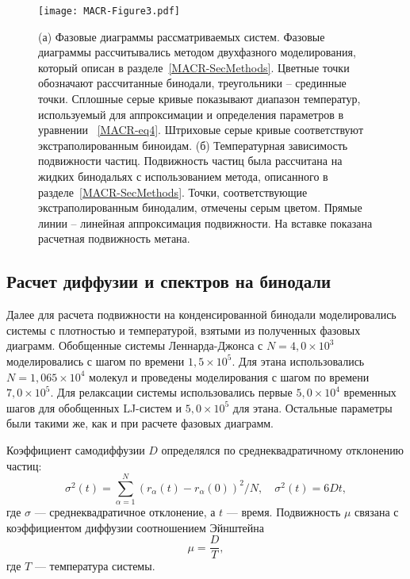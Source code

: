 \begin{figure}[!t]
  \centering
  \texttt{[image: MACR-Figure3.pdf]}
  \caption{(а) Фазовые диаграммы рассматриваемых систем. 
    Фазовые диаграммы рассчитывались методом двухфазного моделирования, который описан в разделе~\ref{MACR-SecMethods}.
    Цветные точки обозначают рассчитанные бинодали, треугольники -- срединные точки.
    Сплошные серые кривые показывают диапазон температур, используемый для аппроксимации и определения параметров в уравнении ~\eqref{MACR-eq4}.
    Штриховые серые кривые соответствуют экстраполированным биноидам.
    (б) Температурная зависимость подвижности частиц.
    Подвижность частиц была рассчитана на жидких бинодальях с использованием метода, описанного в разделе~\ref{MACR-SecMethods}.
    Точки, соответствующие экстраполированным бинодалим, отмечены серым цветом. 
    Прямые линии -- линейная аппроксимация подвижности.
    На вставке показана расчетная подвижность метана.}
  \label{MACR-Figure3}
\end{figure}

\subsection{Расчет диффузии и спектров на бинодали}

Далее для расчета подвижности на конденсированной бинодали моделировались системы с плотностью и температурой, взятыми из полученных фазовых диаграмм.
Обобщенные системы Леннарда-Джонса с $N = 4{,}0 \times 10 ^ 3$ моделировались с шагом по времени $1{,}5 \times 10 ^ 5$.
Для этана использовались $N = 1{,}065 \times 10 ^ 4 $ молекул и проведены моделирования с шагом по времени $7{,}0 \times 10^5 $.
Для релаксации системы использовались первые $ 5{,}0 \times 10 ^ 4 $ временных шагов для обобщенных LJ-систем и $ 5{,}0 \times 10 ^ 5 $ для этана.
Остальные параметры были такими же, как и при расчете фазовых диаграмм.

Коэффициент самодиффузии $D$ определялся по среднеквадратичному отклонению частиц:
\begin{equation}
  \sigma^2(t) = \sum\limits_{\alpha = 1}^{N} (r_{\alpha}(t) - r_{\alpha}(0))^2 / N, \quad \sigma^2(t) = 6Dt,
  \label{MACR-eq5}
\end{equation}
где $\sigma$ — среднеквадратичное отклонение, а $t$ — время.
Подвижность $\mu$ связана с коэффициентом диффузии соотношением Эйнштейна
\begin{equation}
  \mu = \frac{D}{T},
  \label{MACR-eq6}
\end{equation}
где $T$ — температура системы.

